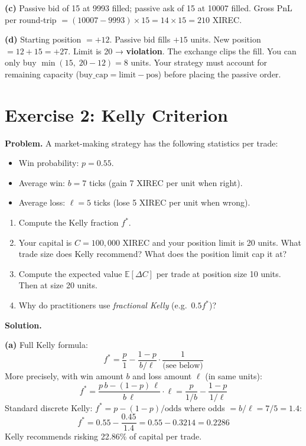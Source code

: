 \documentclass[12pt,a4paper,openany]{report}
\theoremstyle{definition}
\begin{document}
\textbf{(c)} Passive bid of 15 at 9993 filled; passive ask of 15 at 10007 filled. Gross PnL per round-trip $= (10007 - 9993) \times 15 = 14 \times 15 = 210$ XIREC.

\textbf{(d)} Starting position $= +12$. Passive bid fills $+15$ units. New position $= 12 + 15 = +27$. Limit is 20 → \textbf{violation}. The exchange clips the fill. You can only buy $\min(15,\; 20 - 12) = 8$ units. Your strategy must account for remaining capacity ($\text{buy\_cap} = \text{limit} - \text{pos}$) before placing the passive order.

\section*{Exercise 2: Kelly Criterion}

\textbf{Problem.} A market-making strategy has the following statistics per trade:
\begin{itemize}
  \item Win probability: $p = 0.55$.
  \item Average win: $b = 7$ ticks (gain 7 XIREC per unit when right).
  \item Average loss: $\ell = 5$ ticks (lose 5 XIREC per unit when wrong).
\end{itemize}

\begin{enumerate}[label=(\alph*)]
  \item Compute the Kelly fraction $f^*$.
  \item Your capital is $C = 100{,}000$ XIREC and your position limit is 20 units. What trade size does Kelly recommend? What does the position limit cap it at?
  \item Compute the expected value $\mathbb{E}[\Delta C]$ per trade at position size 10 units. Then at size 20 units.
  \item Why do practitioners use \emph{fractional Kelly} (e.g.\ $0.5 f^*$)?
\end{enumerate}

\textbf{Solution.}

\textbf{(a)} Full Kelly formula:
\[
  f^* = \frac{p}{1} - \frac{1-p}{b/\ell} \cdot \frac{1}{\text{(see below)}}
\]
More precisely, with win amount $b$ and loss amount $\ell$ (in same units):
\[
  f^* = \frac{p\,b - (1-p)\,\ell}{b\,\ell} \cdot \ell = \frac{p}{1/b} - \frac{1-p}{1/\ell}
\]
Standard discrete Kelly: $f^* = p - (1-p)/\text{odds}$ where odds $= b/\ell = 7/5 = 1.4$:
\[
  f^* = 0.55 - \frac{0.45}{1.4} = 0.55 - 0.3214 = 0.2286
\]
Kelly recommends risking 22.86\% of capital per trade.
\end{document}
